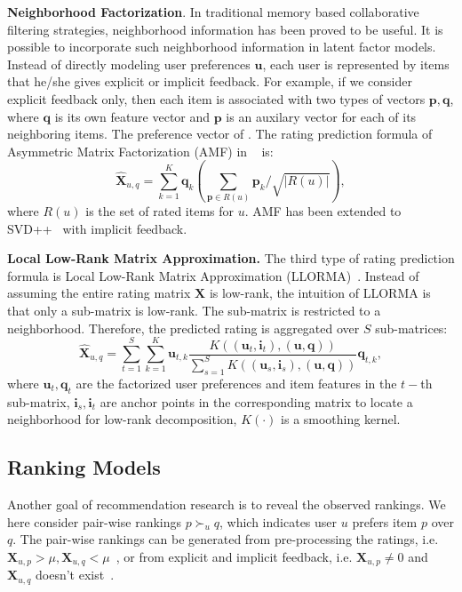 \documentclass[letterpaper]{article} %
\newcommand{\Rating}{\mathbf{X}}
\begin{document}
\textbf{Neighborhood Factorization}. In traditional memory based collaborative filtering strategies, neighborhood information has been proved to be useful. It is possible  to incorporate such neighborhood information in latent factor models. Instead of directly modeling user preferences $\mathbf{u}$, each user is represented by items that he/she gives explicit or implicit feedback. For example, if we consider explicit feedback only, then each item is associated with two types of vectors $\mathbf{p},\mathbf{q}$, where $\mathbf{q}$ is its own feature vector and $\mathbf{p}$ is an auxilary vector for each of its neighboring items. The preference vector of . The rating prediction formula of Asymmetric Matrix Factorization (AMF) in ~\cite{Koren2008Factorization} is:  
 \begin{equation}\label{equ:AMF}
\hat{\Rating}_{u,q}=\sum_{k=1}^{K} \mathbf{q}_{k} (\sum_{\mathbf{p} \in R(u)} \mathbf{p}_k/\sqrt{|R(u)|} ),
\end{equation}
where  $R(u)$ is the set of rated items for $u$. AMF has been extended to SVD++~\cite{Koren2008Factorization} with implicit feedback. 

\textbf{Local Low-Rank Matrix Approximation.} The third type of rating prediction formula is  Local Low-Rank Matrix Approximation (LLORMA)~\cite{Lee2013Local}. Instead of assuming the entire rating matrix $\Rating$ is low-rank, the intuition of LLORMA is that only a sub-matrix is low-rank. The sub-matrix is restricted to a neighborhood. Therefore, the predicted rating is aggregated over $S$ sub-matrices:
\begin{equation}\label{equ:LLORMA}
\hat{\Rating}_{u,q} = \sum_{t=1}^{S} \sum_{k=1}^K \mathbf{u}_{t, k} \frac{K((\mathbf{u}_t,\mathbf{i}_t),(\mathbf{u},\mathbf{q}))}{\sum_{s=1}^{S} K((\mathbf{u}_s,\mathbf{i}_s),(\mathbf{u},\mathbf{q}))} \mathbf{q}_{t,k},
\end{equation}
where $\mathbf{u}_t, \mathbf{q}_t$ are the factorized user preferences and item features in the $t-$th sub-matrix,  $\mathbf{i}_s,\mathbf{i}_t$ are anchor points in the corresponding matrix to locate a neighborhood for low-rank decomposition, $K(\cdot)$ is a smoothing kernel. 
\subsection{Ranking Models}
Another goal of recommendation research is to reveal the observed rankings. We here consider pair-wise rankings $p\succ_u q$, which indicates user $u$ prefers item $p$ over $q$. The pair-wise rankings can be generated from pre-processing  the ratings, i.e. $\Rating_{u,p}> \mu, \Rating_{u,q}<\mu$~\cite{Hu2017Decoupled}, or from explicit and implicit feedback, i.e. $\Rating_{u,p}\neq 0$ and $ \Rating_{u,q}$ doesn't exist~\cite{Rendle2009BPR}. 
\end{document}
